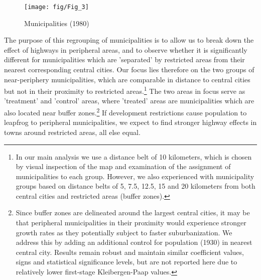 \documentclass[a4paper,authoryear,review]{elsarticle}  	%
\begin{document}
	\begin{figure}[!hbtp]
		\centering
		\caption{Municipalities (1980)}
		\texttt{[image: fig/Fig\_3]}\label{ch3.fig:3}
	\end{figure}

	The purpose of this regrouping of municipalities is to allow us to break down the effect of highways in peripheral areas, and to observe whether it is significantly different for municipalities which are 'separated' by restricted areas from their nearest corresponding central cities. Our focus lies therefore on the two groups of near-periphery municipalities, which are comparable in distance to central cities but not in their proximity to restricted areas.\footnote{In our main analysis we use a distance belt of 10 kilometers, which is chosen by visual inspection of the map and examination of the assignment of municipalities to each group. However, we also experienced with municipality groups based on distance belts of 5, 7.5, 12.5, 15 and 20 kilometers from both central cities and restricted areas (buffer zones).} The two areas in focus serve as 'treatment' and 'control' areas, where 'treated' areas are municipalities which are also located near buffer zones.\footnote{Since buffer zones are delineated around the largest central cities, it may be that peripheral municipalities in their proximity would experience stronger growth rates as they potentially subject to faster suburbanization. We address this by adding an additional control for population (1930) in nearest central city. Results remain robust and maintain similar coefficient values, signs and statistical significance levels, but are not reported here due to relatively lower first-stage Kleibergen-Paap values.}
	If development restrictions cause population to leapfrog to peripheral municipalities, we expect to find stronger highway effects in towns around restricted areas, all else equal. 

		
\end{document}
